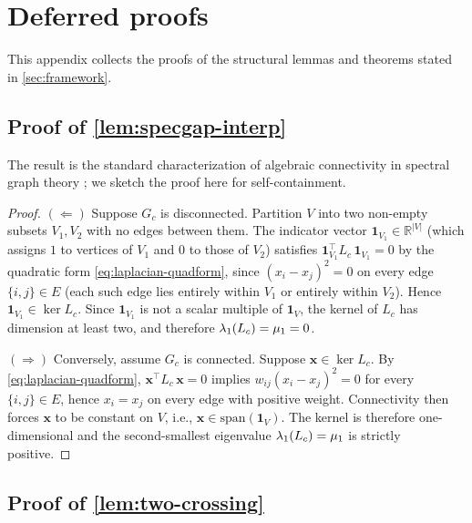 \section{Deferred proofs}
\label{app:proofs}

This appendix collects the proofs of the structural lemmas and
theorems stated in \cref{sec:framework}.

\subsection{Proof of \cref{lem:specgap-interp}}
\label{app:proof:specgap-interp}

The result is the standard characterization of algebraic
connectivity in spectral graph theory \citep{Chung1997,Fiedler1973};
we sketch the proof here for self-containment.

\begin{proof}
$(\Leftarrow)$ Suppose $G_{c}$ is disconnected. Partition $V$
into two non-empty subsets $V_{1}, V_{2}$ with no edges between
them. The indicator vector $\mathbf{1}_{V_{1}} \in
\mathbb{R}^{|V|}$ (which assigns $1$ to vertices of $V_{1}$ and
$0$ to those of $V_{2}$) satisfies $\mathbf{1}_{V_{1}}^{\top}
L_{c}\, \mathbf{1}_{V_{1}} = 0$ by the quadratic form
\eqref{eq:laplacian-quadform}, since $(x_{i} - x_{j})^{2} = 0$
on every edge $\{i, j\} \in E$ (each such edge lies entirely
within $V_{1}$ or entirely within $V_{2}$). Hence
$\mathbf{1}_{V_{1}} \in \ker L_{c}$. Since $\mathbf{1}_{V_{1}}$
is not a scalar multiple of $\mathbf{1}_{V}$, the kernel of
$L_{c}$ has dimension at least two, and therefore
$\lambda_{1}(L_{c}) = \mu_{1} = 0$.

$(\Rightarrow)$ Conversely, assume $G_{c}$ is connected. Suppose
$\mathbf{x} \in \ker L_{c}$. By
\eqref{eq:laplacian-quadform}, $\mathbf{x}^{\top} L_{c}\,
\mathbf{x} = 0$ implies $w_{ij}(x_{i} - x_{j})^{2} = 0$ for
every $\{i, j\} \in E$, hence $x_{i} = x_{j}$ on every edge with
positive weight. Connectivity then forces $\mathbf{x}$ to be
constant on $V$, i.e., $\mathbf{x} \in \mathrm{span}(\mathbf{1}_{V})$.
The kernel is therefore one-dimensional and the second-smallest
eigenvalue $\lambda_{1}(L_{c}) = \mu_{1}$ is strictly positive.
\end{proof}

\subsection{Proof of \cref{lem:two-crossing}}
\label{app:proof:two-crossing}

